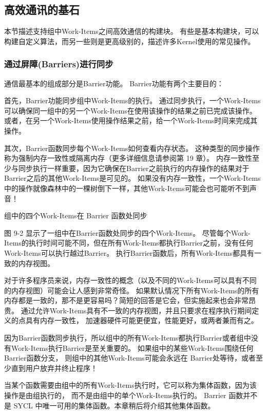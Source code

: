 \subsection{高效通讯的基石}
本节描述支持组中Work-Items之间高效通信的构建块。 
有些是基本构建块，可以构建自定义算法，而另一些则是更高级别的，描述许多Kernel使用的常见操作。

\subsubsection{通过屏障(Barriers)进行同步}
通信最基本的组成部分是Barrier功能。 Barrier功能有两个主要目的：

首先，Barrier功能同步组中Work-Items的执行。 
通过同步执行，一个Work-Items可以确保同一组中的另一个Work-Items在使用该操作的结果之前已完成该操作。 
或者，在另一个Work-Items使用操作结果之前，给一个Work-Items时间来完成其操作。

其次，Barrier函数同步每个Work-Items如何查看内存状态。 
这种类型的同步操作称为强制内存一致性或隔离内存（更多详细信息请参阅第 19 章）。 
内存一致性至少与同步执行一样重要，因为它确保在Barrier之前执行的内存操作的结果对于Barrier之后的其他Work-Items是可见的。 
如果没有内存一致性，一个Work-Items中的操作就像森林中的一棵树倒下一样，其他Work-Items可能会也可能听不到声音！

{\color{red} 组中的四个Work-Items在 Barrier 函数处同步}

图 9-2 显示了一组中在Barrier函数处同步的四个Work-Items。 
尽管每个Work-Items的执行时间可能不同，但在所有Work-Items都执行Barrier之前，没有任何Work-Items可以执行越过Barrier。 
执行Barrier函数后，所有Work-Items都具有一致的内存视图。

\begin{remark}[为什么默认情况下内存不一致？]
对于许多程序员来说，内存一致性的概念（以及不同的Work-Items可以具有不同的内存视图）可能会让人感到非常奇怪。
如果默认情况下所有Work-Items的所有内存都是一致的，那不是更容易吗？简短的回答是它会，但实施起来也会非常昂贵。
通过允许Work-Items具有不一致的内存视图，并且只要求在程序执行期间定义的点具有内存一致性，
加速器硬件可能更便宜，性能更好，或两者兼而有之。
\end{remark}

因为Barrier函数同步执行，所以组中的所有Work-Items都执行Barrier或者组中没有Work-Items执行Barrier是至关重要的。 
如果组中的某些Work-Items围绕任何 Barrier函数分支，
则组中的其他Work-Items可能会永远在 Barrier处等待，或者至少直到用户放弃并终止程序！

\begin{remark}[集体函数]
当某个函数需要由组中的所有Work-Items执行时，它可以称为集体函数，因为该操作是由组执行的，
而不是由组中的单个Work-Items执行的。
Barrier 函数并不是 SYCL 中唯一可用的集体函数。本章稍后将介绍其他集体函数。
\end{remark}


